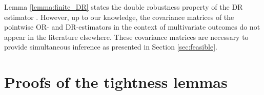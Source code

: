 \documentclass[12pt, A4]{article}
\begin{document}
    Lemma \ref{lemma:finite_DR} states the double robustness property of the DR estimator \cite[e.g.][]{tsiatis2006semiparametric}. 
    However, up to our knowledge, the covariance matrices of the pointwise OR- and DR-estimators in the context of multivariate outcomes do not appear in the literature elsewhere. 
    These covariance matrices are necessary to provide simultaneous inference as presented in Section \ref{sec:feasible}.
\section{Proofs of the tightness lemmas}\label{tight.app} %
\end{document}
